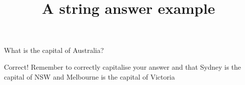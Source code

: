 \documentclass[hidesidemenu]{webquiz}
\title{A string answer example}
\begin{document}
  \begin{question}     %
     What is the capital of Australia?

     \whenRight Correct!
     \whenWrong Remember to correctly capitalise your answer
     and that Sydney is the capital of NSW and Melbourne is the
     capital of Victoria
  \end{question}
\end{document}

